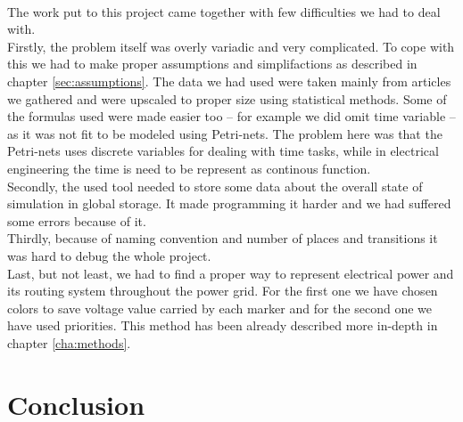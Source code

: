 \documentclass[a4paper]{article}
\begin{document}
\paragraph{}

The work put to this project came together with few difficulties we had to deal with.\\

Firstly, the problem itself was overly variadic and very complicated. To cope with this we had to make proper assumptions and simplifactions as described in chapter \ref{sec:assumptions}. The data we had used were taken mainly from articles we gathered and were upscaled to proper size using statistical methods. Some of the formulas used were made easier too -- for example we did omit time variable -- as it was not fit to be modeled using Petri-nets. The problem here was that the Petri-nets uses discrete variables for dealing with time tasks, while in electrical engineering the time is need to be represent as continous function.\\

Secondly, the used tool needed to store some data about the overall state of simulation in global storage. It made programming it harder and we had suffered some errors because of it.\\

Thirdly, because of naming convention and number of places and transitions it was hard to debug the whole project.\\

Last, but not least, we had to find a proper way to represent electrical power and its routing system throughout the power grid. For the first one we have chosen colors to save voltage value carried by each marker and for the second one we have used priorities. This method has been already described more in-depth in chapter \ref{cha:methods}.\\

% 

%
\section{Conclusion}
\label{cha:conclusion}
\paragraph{}
\end{document}
